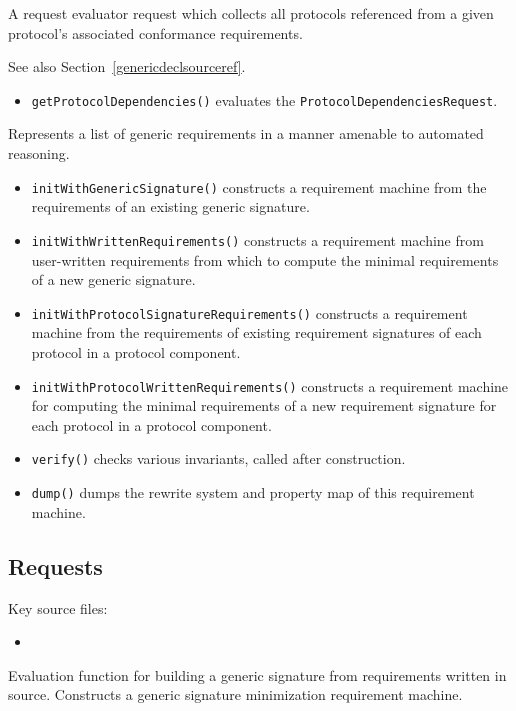 \documentclass[../generics]{subfiles}
\begin{document}
A request evaluator request which collects all protocols referenced from a given protocol's associated conformance requirements.

See also Section~\ref{genericdeclsourceref}.
\begin{itemize}
\item \texttt{getProtocolDependencies()} evaluates the \texttt{ProtocolDependenciesRequest}.
\end{itemize}

Represents a list of generic requirements in a manner amenable to automated reasoning.
\begin{itemize}
\item \texttt{initWithGenericSignature()} constructs a requirement machine from the requirements of an existing generic signature.
\item \texttt{initWithWrittenRequirements()} constructs a requirement machine from user-written requirements from which to compute the minimal requirements of a new generic signature.
\item \texttt{initWithProtocolSignatureRequirements()} constructs a requirement machine from the requirements of existing requirement signatures of each protocol in a protocol component.
\item \texttt{initWithProtocolWrittenRequirements()} constructs a requirement machine for computing the minimal requirements of a new requirement signature for each protocol in a protocol component.
\item \texttt{verify()} checks various invariants, called after construction.
\item \texttt{dump()} dumps the rewrite system and property map of this requirement machine.
\end{itemize}

\subsection*{Requests}

Key source files:
\begin{itemize}
\item {}
\end{itemize}

Evaluation function for building a generic signature from requirements written in source. Constructs a generic signature minimization requirement machine.
\end{document}
